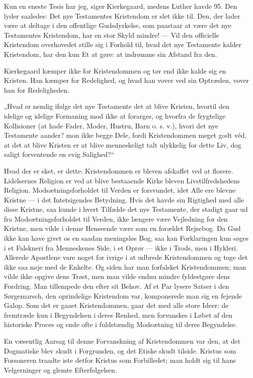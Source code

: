 \documentclass[12pt,a4paper,openany]{book}
\newcommand{\opage}[1]{\marginnote{\footnotesize\textit{[#1]}}}
\begin{document}
Kun en eneste Tesis har jeg, siger Kierkegaard, medens Luther havde 95. Den
lyder saaledes: Det nye Testamentes Kristendom er slet ikke til. Den, der lader
være at deltage i den offentlige Gudsdyrkelse, som paastaar at være det nye
Testamentes Kristendom, har en stor Skyld mindre! --- Vil den officielle
Kristendom overhovedet stille sig i Forhold til, hvad det nye Testamente kalder
Kristendom, har den kun Et at gøre: at indrømme sin Afstand fra den.

Kierkegaard kæmper ikke for Kristendommen og tør end ikke kalde sig en Kristen.
Han kæmper for Redelighed, og
\setcounter{footnote}{0}%
\opage{169}hvad han vover ved sin Optræden, vover han for Redeligheden.

„Hvad er nemlig ifølge det nye Testamente det at blive Kristen, hvortil den
idelige og idelige Formaning mod ikke at forarges, og hvorfra de frygtelige
Kollisioner (at hade Fader, Moder, Hustru, Barn o. s. v.), hvori det nye
Testamente aander? mon ikke begge Dele, fordi Kristendommen meget godt véd, at
det at blive Kristen er at blive menneskeligt talt ulykkelig for dette Liv, dog
saligt forventende en evig Salighed?“

Hvad der er sket, er dette: Kristendommen er bleven afskaffet ved at florere.
Lidelsernes Religion er ved at blive bestaaende Kirke bleven Livstilfredshedens
Religion. Modsætningsforholdet til Verden er forsvundet, idet Alle ere blevne
Kristne --- i det Intetsigendes Betydning. Hvis det havde sin Rigtighed med
alle disse Kristne, saa kunde i hvert Tilfælde det nye Testamente, der stadigt
gaar ud fra Modsætningsforholdet til Verden, ikke længere være Vejledning for
den Kristne, men vilde i denne Henseende være som en forældet Rejsebog. Da Gud
ikke kan have givet os en saadan meningsløs Bog, saa kan Forklaringen kun søges
i et Falskneri fra Menneskenes Side, i et Oprør --- ikke i Trods, men i
Hykleri. Allerede Apostlene vare noget for ivrige i at udbrede Kristendommen og
toge det ikke saa nøje med de Enkelte. Og siden har man forfalsket
Kristendommen; man vilde ikke opgive dens Trøst, men man vilde endnu mindre
fyldestgøre dens Fordring. Man tillempede den efter sit Behov. Af et Par lysere
Satser i den Sørgemarsch, den oprindelige Kristendom var, komponerede man sig
en fejende Galop. Som det er gaaet Kristendommen, gaar det med alle store
Ideer: de fremtræde kun i Begyndelsen i deres Renhed, men forvanskes i Løbet af
den historiske Proces og ende ofte i fuldstændig Modsætning til deres Begyndelse.

En væsentlig Aarsag til denne Forvanskning af Kristendommen var den, at det
Dogmatiske blev skudt i Forgrunden, og det Etiske skudt tilside. Kristus som
Forsoneren traadte iste%
\setcounter{footnote}{0}%
\opage{170}detfor Kristus som Forbilledet; man holdt sig til hans Velgerninger
og glemte Efterfølgelsen.
\end{document}
